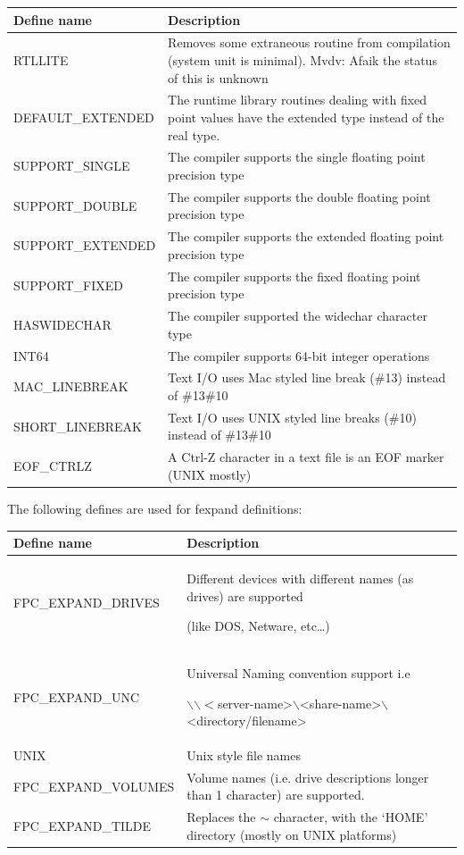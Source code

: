 \documentclass [12pt]{article}
\begin{document}
\begin{longtable}{|l|p{10cm}|}
\hline
Define name & Description \\
\hline
\endhead
\hline
\endfoot
RTLLITE& 
    Removes some extraneous routine from compilation (system unit
    is minimal). Mvdv: Afaik the status of this is unknown \\
DEFAULT{\_}EXTENDED& 

    The runtime library routines dealing with fixed point values have the
    \textsf{extended} type instead of the \textsf{real} type. \\
SUPPORT{\_}SINGLE& 
    The compiler supports the \textsf{single} floating point precision type \\
SUPPORT{\_}DOUBLE& 
    The compiler supports the \textsf{double }floating point precision type \\
SUPPORT{\_}EXTENDED& 
    The compiler supports the \textsf{extended }floating point
    precision type \\
SUPPORT{\_}FIXED& 
    The compiler supports the \textsf{fixed} floating point precision type \\
HASWIDECHAR& 
    The compiler supported the \textsf{widechar} character type \\
INT64& 
    The compiler supports 64-bit integer operations \\
MAC{\_}LINEBREAK& 
    Text I/O uses Mac styled line break ({\#}13) instead of {\#}13{\#}10 \\
SHORT{\_}LINEBREAK& 
    Text I/O uses UNIX styled line breaks ({\#}10) instead of {\#}13{\#}10 \\
EOF{\_}CTRLZ& 
    A Ctrl-Z character in a text file is an EOF marker (UNIX mostly) \\
\end{longtable}

The following defines are used for fexpand definitions:

\begin{longtable}{|l|p{10cm}|}
\hline
Define name & Description \\
\hline
\endhead
\hline
\endfoot
FPC{\_}EXPAND{\_}DRIVES& 
    Different devices with different names (as drives) are
    supported \par (like DOS, Netware, etc\ldots ) \\
FPC{\_}EXPAND{\_}UNC& 
    Universal Naming convention support i.e \par $\backslash \backslash
    < $server-name>$\backslash $<share-name>$\backslash $<directory/filename> \\
UNIX& 
    Unix style file names \\
FPC{\_}EXPAND{\_}VOLUMES& 
    Volume names (i.e. drive descriptions longer than 1
    character) are supported. \\
FPC{\_}EXPAND{\_}TILDE& 
    Replaces the $\sim $ character, with the `HOME' directory
    (mostly on UNIX platforms) \\
\end{longtable}
\end{document}
